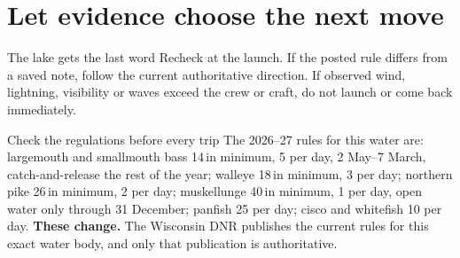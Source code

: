 \newpage
\section{Let evidence choose the next move}

\begin{center}
\end{center}

\begin{teloshazard}{The lake gets the last word}
Recheck at the launch. If the posted rule differs from a saved note, follow the
current authoritative direction. If observed wind, lightning, visibility or
waves exceed the crew or craft, do not launch or come back immediately.
\end{teloshazard}

\begin{teloshazard}{Check the regulations before every trip}
The 2026--27 rules for this water are: largemouth and smallmouth bass 14\,in
minimum, 5 per day, 2 May--7 March, catch-and-release the rest of the year;
walleye 18\,in minimum, 3 per day; northern pike 26\,in minimum, 2 per day;
muskellunge 40\,in minimum, 1 per day, open water only through 31 December;
panfish 25 per day; cisco and whitefish 10 per day. \textbf{These change.} The
Wisconsin DNR publishes the current rules for this exact water body, and only
that publication is authoritative.
\end{teloshazard}

